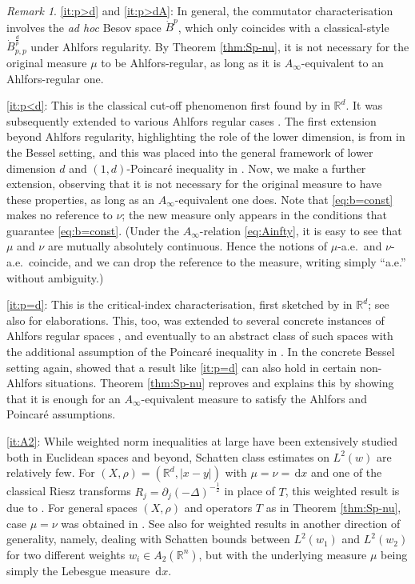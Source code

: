 \documentclass[reqno]{amsart}
\newcommand{\ud}[0]{\,\mathrm{d}}
\newcommand{\abs}[1]{|#1|}
\newcommand{\R}{\mathbb{R}}
\theoremstyle{plain}
\theoremstyle{definition}
\theoremstyle{remark}
\newtheorem{remark}[equation]{Remark}
\begin{document}
\begin{remark}
\eqref{it:p>d} and \eqref{it:p>dA}: In general, the commutator characterisation involves the {\em ad hoc} Besov space $\dot B^p$, which only coincides with a classical-style $\dot B^{\frac dp}_{p,p}$ under Ahlfors regularity. By Theorem \ref{thm:Sp-nu}, it is not necessary for the original measure $\mu$ to be Ahlfors-regular, as long as it is $A_\infty$-equivalent to an Ahlfors-regular one.

\eqref{it:p<d}: This is the classical cut-off phenomenon first found by \cite{JW:82} in $\R^d$. It was subsequently extended to various Ahlfors regular cases \cite{FLL:23,LXY}. The first extension beyond Ahlfors regularity, highlighting the role of the lower dimension, is from \cite[Theorem 1.5 and Remark 1.6]{FLLX} in the Bessel setting, and this was placed into the general framework of lower dimension $d$ and $(1,d)$-Poincar\'e inequality in \cite[Theorem 1.1]{Hyt:Sp}. Now, we make a further extension, observing that it is not necessary for the original measure to have these properties, as long as an $A_\infty$-equivalent one does. Note that \eqref{eq:b=const} makes no reference to $\nu$; the new measure only appears in the conditions that guarantee \eqref{eq:b=const}. (Under the $A_\infty$-relation \eqref{eq:Ainfty}, it is easy to see that $\mu$ and $\nu$ are mutually absolutely continuous. Hence the notions of $\mu$-a.e.\ and $\nu$-a.e.\ coincide, and we can drop the reference to the measure, writing simply ``a.e.'' without ambiguity.)

\eqref{it:p=d}: This is the critical-index characterisation, first sketched by \cite{CST} in $\R^d$; see also \cite{Frank,FSZ:23,LMSZ} for elaborations. This, too, was extended to several concrete instances of Ahlfors regular spaces \cite{FLMSZ,LXY}, and eventually to an abstract class of such spaces with the additional assumption of the Poincar\'e inequality in \cite{Hyt:Sp}. In the concrete Bessel setting again, \cite{FLSZ} showed that a result like \eqref{it:p=d} can also hold in certain non-Ahlfors situations. Theorem \ref{thm:Sp-nu} reproves and explains this by showing that it is enough for an $A_\infty$-equivalent measure to satisfy the Ahlfors and Poincar\'e assumptions.

\eqref{it:A2}: While weighted norm inequalities at large have been extensively studied both in Euclidean spaces and beyond, Schatten class estimates on $L^2(w)$ are relatively few. For $(X,\rho)=(\R^d,\abs{x-y})$ with $\mu=\nu=\ud x$ and one of the classical Riesz transforms $R_j=\partial_j(-\Delta)^{-\frac12}$ in place of $T$, this weighted result is due to \cite{GLW:23}. For general spaces $(X,\rho)$ and operators $T$ as in Theorem \ref{thm:Sp-nu}, case $\mu=\nu$ was obtained in \cite{Hyt:Sp}. See also \cite{LLW:2wH,LLWW:2wR} for weighted results in another direction of generality, namely, dealing with Schatten bounds between $L^2(w_1)$ and $L^2(w_2)$ for two different weights $w_i\in A_2(\R^n)$, but with the underlying measure $\mu$ being simply the Lebesgue measure $\ud x$.
\end{remark}
\end{document}
